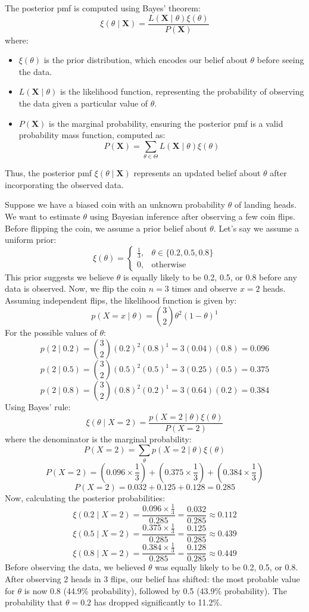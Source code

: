 The posterior pmf is computed using Bayes’ theorem:
\[
\xi(\theta \mid \mathbf{X}) = \frac{L(\mathbf{X} \mid \theta) \xi(\theta)}{P(\mathbf{X})}
\]
where:
\begin{itemize}
\item \(\xi(\theta)\) is the prior distribution, which encodes our belief about \(\theta\) before seeing the data.
\item \(L(\mathbf{X} \mid \theta)\) is the likelihood function, representing the probability of observing the data given a particular value of \(\theta\).
\item \(P(\mathbf{X})\) is the marginal probability, ensuring the posterior pmf is a valid probability mass function, computed as:
\[
P(\mathbf{X}) = \sum_{\theta \in \Theta} L(\mathbf{X} \mid \theta) \xi(\theta)
\]
\end{itemize}

Thus, the posterior pmf $\xi(\theta \mid \mathbf{X})$ represents an updated belief about $\theta$ after incorporating the observed data.

\begin{example}
Suppose we have a biased coin with an unknown probability \(\theta\) of landing heads. We want to estimate \(\theta\) using Bayesian inference after observing a few coin flips. Before flipping the coin, we assume a prior belief about \(\theta\). Let's say we assume a uniform prior:
\[
\xi(\theta) = 
\begin{cases}
\frac{1}{3}, & \theta \in \{0.2, 0.5, 0.8\} \\
0, & \text{otherwise}
\end{cases}
\]
This prior suggests we believe \(\theta\) is equally likely to be 0.2, 0.5, or 0.8 before any data is observed. Now, we flip the coin \(n=3\) times and observe \(x=2\) heads. Assuming independent flips, the likelihood function is given by:
\[
p(X = x \mid \theta) = \binom{3}{2} \theta^2 (1 - \theta)^1
\]
For the possible values of \(\theta\):
\[
p(2 \mid 0.2) = \binom{3}{2} (0.2)^2 (0.8)^1 = 3(0.04)(0.8) = 0.096
\]
\[
p(2 \mid 0.5) = \binom{3}{2} (0.5)^2 (0.5)^1 = 3(0.25)(0.5) = 0.375
\]
\[
p(2 \mid 0.8) = \binom{3}{2} (0.8)^2 (0.2)^1 = 3(0.64)(0.2) = 0.384
\]
Using Bayes’ rule:
\[
\xi(\theta \mid X = 2) = \frac{p(X = 2 \mid \theta) \xi(\theta)}{P(X = 2)}
\]
where the denominator is the marginal probability:
\[
P(X = 2) = \sum_{\theta} p(X = 2 \mid \theta) \xi(\theta)
\]
\[
P(X = 2) = (0.096 \times \frac{1}{3}) + (0.375 \times \frac{1}{3}) + (0.384 \times \frac{1}{3})
\]
\[
P(X = 2) = 0.032 + 0.125 + 0.128 = 0.285
\]
Now, calculating the posterior probabilities:
\[
\xi(0.2 \mid X = 2) = \frac{0.096 \times \frac{1}{3}}{0.285} = \frac{0.032}{0.285} \approx 0.112
\]
\[
\xi(0.5 \mid X = 2) = \frac{0.375 \times \frac{1}{3}}{0.285} = \frac{0.125}{0.285} \approx 0.439
\]
\[
\xi(0.8 \mid X = 2) = \frac{0.384 \times \frac{1}{3}}{0.285} = \frac{0.128}{0.285} \approx 0.449
\]
Before observing the data, we believed \(\theta\) was equally likely to be 0.2, 0.5, or 0.8. After observing 2 heads in 3 flips, our belief has shifted: the most probable value for \(\theta\) is now 0.8 (44.9\% probability), followed by 0.5 (43.9\% probability). The probability that \(\theta = 0.2\) has dropped significantly to 11.2\%.
\end{example}


